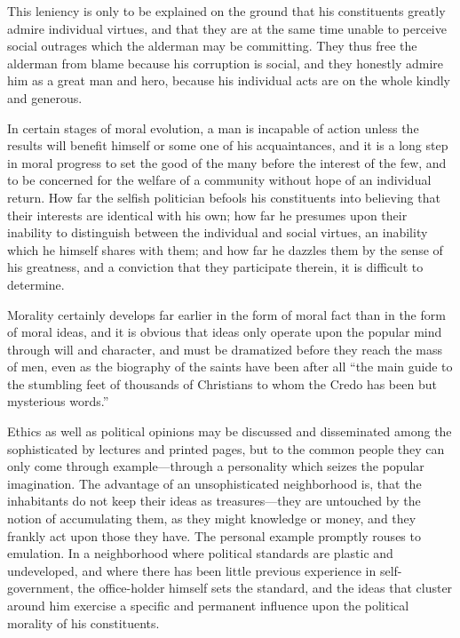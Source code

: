 \documentclass[]{article}
\begin{document}
\begin{sectionbody}
\addamsparagraph This leniency is only to be explained on the ground that his
constituents greatly admire individual virtues, and that they are at the
same time unable to perceive social outrages which the alderman may be
committing. They thus free the alderman from blame because his
corruption is social, and they honestly admire him as a great man and
hero, because his individual acts are on the whole kindly and generous.

\addamsparagraph In certain stages of moral evolution, a man is incapable of action
unless the results will benefit himself or some one of his
acquaintances, and it is a long step in moral progress to set the good
of the many before the interest of the few, and to be concerned for the
welfare of a community without hope of an individual return. How far the
selfish politician befools his constituents into believing that their
interests are identical with his own; how far he presumes upon their
inability to distinguish between the individual and social virtues, an
inability which he himself shares with them; and how far he dazzles them
by the sense of his greatness, and a conviction that they participate
therein, it is difficult to determine.

\addamsparagraph Morality certainly develops far earlier in the form of moral fact than
in the form of moral ideas, and it is obvious that ideas only operate
upon the popular mind through will and character, and must be dramatized
before they reach the mass of men, even as the biography of the saints
have been after all ``the main guide to the stumbling feet of thousands
of Christians to whom the Credo has been but mysterious words.''

\addamsparagraph Ethics as well as political opinions may be discussed and disseminated
among the sophisticated by lectures and printed pages, but to the common
people they can only come through example---through a personality which
seizes the popular imagination. The advantage of an unsophisticated
neighborhood is, that the inhabitants do not keep their ideas as
treasures---they are untouched by the notion of accumulating them, as
they might knowledge or money, and they frankly act upon those they
have. The personal example promptly rouses to emulation. In a
neighborhood where political standards are plastic and undeveloped, and
where there has been little previous experience in self-government, the
office-holder himself sets the standard, and the ideas that cluster
around him exercise a specific and permanent influence upon the
political morality of his constituents.


\end{sectionbody}
\end{document}
